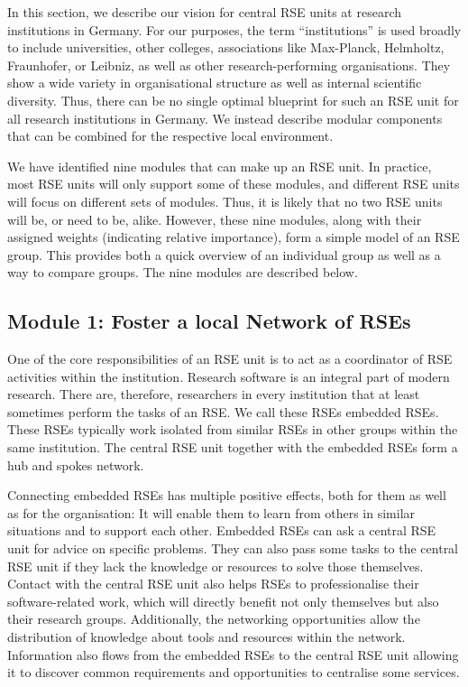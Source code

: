 \documentclass[10pt,letterpaper]{article}
\begin{document}
In this section, we describe our vision for central RSE units at research institutions in Germany.
For our purposes, the term “institutions” is used broadly to include universities, other colleges, associations like Max-Planck, Helmholtz, Fraunhofer, or Leibniz, as well as other research-performing organisations.
They show a wide variety in organisational structure as well as internal scientific diversity.
Thus, there can be no single optimal blueprint for such an RSE unit for all research institutions in Germany.
We instead describe modular components that can be combined for the respective local environment.

We have identified nine modules that can make up an RSE unit.
In practice, most RSE units will only support some of these modules, and different RSE units will focus on different sets of modules.
Thus, it is likely that no two RSE units will be, or need to be, alike.
However, these nine modules, along with their assigned weights (indicating relative importance), form a simple model of an RSE group.
This provides both a quick overview of an individual group as well as a way to compare groups.
The nine modules are described below.

\subsection*{Module 1: Foster a local Network of RSEs}%
\label{sec:network}

One of the core responsibilities of an RSE unit is to act as a coordinator of RSE activities within the institution.
Research software is an integral part of modern research.
There are, therefore, researchers in every institution that at least sometimes perform the tasks of an RSE\@.
We call these RSEs embedded RSEs.
These RSEs typically work isolated from similar RSEs in other groups within the same institution.
The central RSE unit together with the embedded RSEs form a hub and spokes network.

Connecting embedded RSEs has multiple positive effects, both for them as well as for the organisation:
It will enable them to learn from others in similar situations and to support each other.
Embedded RSEs can ask a central RSE unit for advice on specific problems.
They can also pass some tasks to the central RSE unit if they lack the knowledge or resources to solve those themselves.
Contact with the central RSE unit also helps RSEs to professionalise their software-related work, which will directly benefit not only themselves but also their research groups.
Additionally, the networking opportunities allow the distribution of knowledge about tools and resources within the network.
Information also flows from the embedded RSEs to the central RSE unit allowing it to discover common requirements and opportunities to centralise some services.
\end{document}
